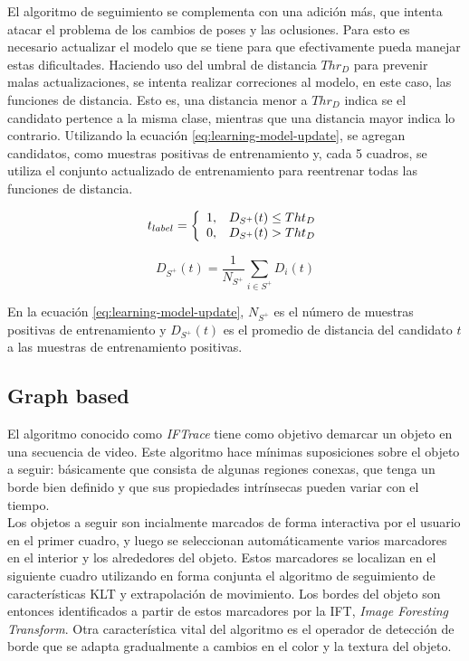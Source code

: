 \documentclass[a4paper,10pt]{article}
\begin{document}
El algoritmo de seguimiento se complementa con una adición más, que 
intenta atacar el problema de los cambios de poses y las oclusiones.
Para esto es necesario actualizar el modelo que se tiene para 
que efectivamente pueda manejar estas dificultades. 
Haciendo uso del umbral de distancia $Thr_{D}$ para prevenir
malas actualizaciones, se intenta realizar correciones al modelo,
en este caso, las funciones de distancia. Esto es, una distancia
menor a $Thr_{D}$ indica se el candidato pertence a la misma clase,
mientras que una distancia mayor indica lo contrario. Utilizando 
la ecuación \ref{eq:learning-model-update}, se agregan candidatos,
como muestras positivas de entrenamiento y, cada 5 cuadros, 
se utiliza el conjunto actualizado de entrenamiento para 
reentrenar todas las funciones de distancia.

\begin{equation}
    \label{eq:learning-model-update}
    t_{label} = \left\{ 
                \begin{array}{l l}
                    1, & D_{S^{+}}(t) \leq Tht_{D}\\
                    0, & D_{S^{+}}(t) >  Tht_{D}
                \end{array} \right.
\end{equation}

\begin{equation}
    D_{S^{+}}(t) = \dfrac{1}{N_{S^{+}}} \sum_{i \in S^{+}} D_{i}(t)
\end{equation}

En la ecuación \ref{eq:learning-model-update}, $N_{S^{+}}$ es el 
número de muestras positivas de entrenamiento y $D_{S^{+}}(t)$
es el promedio de distancia del candidato $t$ a las muestras
de entrenamiento positivas.

\subsection{Graph based}

El algoritmo conocido como \textit{IFTrace} tiene como objetivo demarcar un objeto en una secuencia de video. Este algoritmo hace mínimas
suposiciones sobre el objeto a seguir: básicamente que consista de algunas regiones conexas, que tenga un borde bien definido y que sus propiedades
intrínsecas pueden variar con el tiempo.\\
Los objetos a seguir son incialmente marcados de forma interactiva por el usuario en el primer cuadro, y luego se seleccionan automáticamente
varios marcadores en el interior y los alrededores del objeto. Estos marcadores se localizan en el siguiente cuadro utilizando en forma
conjunta el algoritmo de
seguimiento de características KLT \cite{KLT} y extrapolación de movimiento. Los bordes del objeto son entonces identificados a partir de estos marcadores por la IFT, 
\textit{Image Foresting Transform}\cite{IFT}. Otra característica vital del algoritmo es el operador de detección de borde que se adapta gradualmente a cambios en el 
color y la textura del objeto. \\
\end{document}
